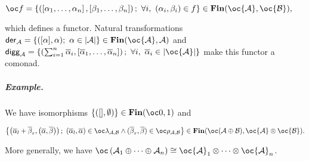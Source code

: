 \(\oc f =\left\{\left(\left[\alpha_1,\ldots,\alpha_n\right],\left[\beta_1,\ldots,\beta_n\right]\right);\  \forall i,\ (\alpha_i,\beta_i)\in f\right\} \in \mathbf{Fin}(\oc {\mathcal A}, \oc {\mathcal B}),\)

which defines a functor. Natural transformations
\(\mathsf{der}_{{\mathcal A}}=\left\{([\alpha],\alpha);\  \alpha\in \web{{\mathcal A}}\right\}\in\mathbf{Fin}(\oc{\mathcal A},{\mathcal A})\)
and
\(\mathsf{digg}_{{\mathcal A}}=\left\{\left(\sum_{i=1}^n\overline\alpha_i,\left[\overline\alpha_1,\ldots,\overline\alpha_n\right]\right);\ \forall i,\ \overline\alpha_i\in\web{\oc {\mathcal A}}\right\}\)
make this functor a comonad.

\subparagraph{Example.}\label{example.-3}

We have isomorphisms
\(\left\{([],\emptyset)\right\}\in\mathbf{Fin}(\oc\zero,\one)\) and

\(\left\{ \left(\overline\alpha_l+\overline\beta_r,\left(\overline\alpha,\overline\beta\right)\right);\ (\overline\alpha_l,\overline\alpha)\in\oc\lambda_{{\mathcal A},{\mathcal B}}\wedge(\overline\beta_r,\overline\beta)\in\oc\rho_{{\mathcal A},{\mathcal B}}\right\} \in\mathbf{Fin}(\oc({\mathcal A}\oplus{\mathcal B}),\oc{\mathcal A}\tens\oc{\mathcal B}).\)

More generally, we have
\(\oc\left({\mathcal A}_1\oplus\cdots\oplus{\mathcal A}_n\right)\cong\oc{\mathcal A}_1\tens\cdots\tens\oc{\mathcal A}_n\).


